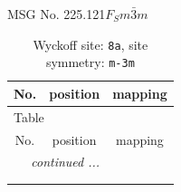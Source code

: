 \documentclass[fleqn,8pt]{jsarticle}
\begin{document}
\setcounter{MaxMatrixCols}{32}

\renewcommand{\tablename}{Table~}
\renewcommand{\figurename}{Figure~}
\begin{center}
\LARGE
MSG No. 225.121\quad$F_{S}m\bar{3}m$
\end{center}
\renewcommand{\arraystretch}{1.2}
\begin{longtable}{ccc}
\caption{Wyckoff site: {\tt 8a}, site symmetry: {\tt m-3m}}
 \\
 \hline \hline
No. & position & mapping \\ \hline \endfirsthead

\multicolumn{2}{l}{\tablename\ \thetable{}} \\
 \hline \hline
No. & position & mapping \\ \hline \endhead

 \hline \hline
\multicolumn{2}{r}{\footnotesize\it continued ...} \\ \endfoot

 \hline \hline
\multicolumn{2}{r}{} \\ \endlastfoot


\end{longtable}
\end{document}
